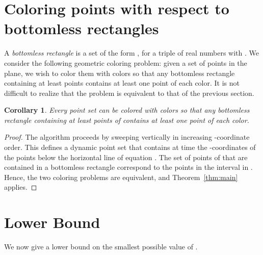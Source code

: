 \documentclass[11pt,a4paper]{amsart}
\theoremstyle{plain}
\newtheorem{cor}[theorem]{Corollary}
\theoremstyle{definition}
\begin{document}
\section{Coloring points with respect to bottomless rectangles}
\label{sec:bottom}

A {\em bottomless rectangle} is a set of the form , for a triple of real numbers  with . We consider the following geometric coloring problem: given a set of points in the plane, we wish to color them with  colors so that any bottomless rectangle containing at least  points contains at least one point of each color. It is not difficult to realize that the problem is equivalent to that of the previous section.

\begin{cor}
\label{cor:main}
Every point set  can be colored with  colors so that any bottomless rectangle containing at least  points of  contains at least one point of each color.
\end{cor}
\begin{proof}
The algorithm proceeds by sweeping  vertically in increasing -coordinate order. This defines a dynamic point set  that contains at time  the -coordinates of the points below the horizontal line of equation . The set of points of  that are contained in a bottomless rectangle  correspond to the points in the interval  in . Hence, the two coloring problems are equivalent, and Theorem~\ref{thm:main} applies.
\end{proof}

\section{Lower Bound}
\label{sec:lb}

We now give a lower bound on the smallest possible value of .
\end{document}
